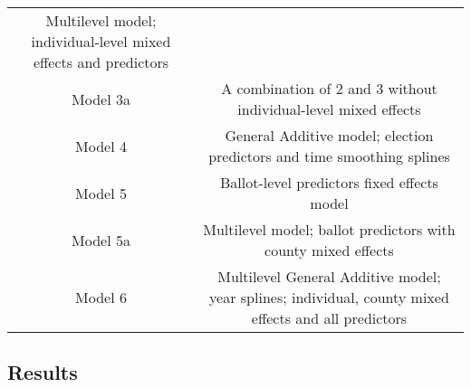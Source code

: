 \documentclass[12pt,twoside]{reedthesis}
\begin{document}
\begin{longtable}[]{@{}cc@{}}
\begin{minipage}[t]{0.80\columnwidth}
  Multilevel model; individual-level mixed effects and predictors\strut
  \end{minipage}\tabularnewline
  \begin{minipage}[t]{0.15\columnwidth}\centering\strut
  Model 3a\strut
  \end{minipage} & \begin{minipage}[t]{0.80\columnwidth}\centering\strut
  A combination of 2 and 3 without individual-level mixed effects\strut
  \end{minipage}\tabularnewline
  \begin{minipage}[t]{0.15\columnwidth}\centering\strut
  Model 4\strut
  \end{minipage} & \begin{minipage}[t]{0.80\columnwidth}\centering\strut
  General Additive model; election predictors and time smoothing
  splines\strut
  \end{minipage}\tabularnewline
  \begin{minipage}[t]{0.15\columnwidth}\centering\strut
  Model 5\strut
  \end{minipage} & \begin{minipage}[t]{0.80\columnwidth}\centering\strut
  Ballot-level predictors fixed effects model\strut
  \end{minipage}\tabularnewline
  \begin{minipage}[t]{0.15\columnwidth}\centering\strut
  Model 5a\strut
  \end{minipage} & \begin{minipage}[t]{0.80\columnwidth}\centering\strut
  Multilevel model; ballot predictors with county mixed effects\strut
  \end{minipage}\tabularnewline
  \begin{minipage}[t]{0.15\columnwidth}\centering\strut
  Model 6\strut
  \end{minipage} & \begin{minipage}[t]{0.80\columnwidth}\centering\strut
  Multilevel General Additive model; year splines; individual, county
  mixed effects and all predictors\strut
  \end{minipage}\tabularnewline
  \bottomrule
  \end{longtable}
  
  \subsection{Results}\label{results-1}
  
\end{document}
